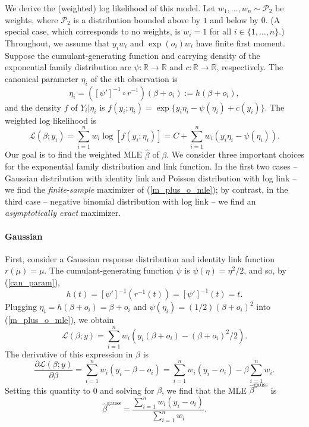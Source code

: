 \documentclass[12pt]{article}
\begin{document}
\begin{appendices}
\begin{refsection}
		We derive the (weighted) log likelihood of this model. Let $w_1, \dots, w_n \sim \mathcal{P}_2$ be weights, where $\mathcal{P}_2$ is a distribution bounded above by $1$ and below by $0$. (A special case, which corresponds to no weights, is $w_i = 1$ for all $i \in \{1, \dots, n\}$.) Throughout, we assume that $y_iw_i$ and $\exp(o_i)w_i$ have finite first moment.  Suppose the cumulant-generating function and carrying density of the exponential family distribution are $\psi:\mathbb{R} \to \mathbb{R}$ and $c: \mathbb{R} \to \mathbb{R}$, respectively. The canonical parameter $\eta_i$ of the $i$th observation is 
		\begin{equation}\label{can_param}
		\eta_i = ([\psi']^{-1} \circ r^{-1})(\beta + o_i) := h(\beta + o_i),
		\end{equation}
		and the density $f$ of $Y_i | \eta_i$ is
		$f(y_i; \eta_i) = \exp\{y_i \eta_i - \psi(\eta_i) + c(y_i)\}.$ The weighted log likelihood is
		\begin{equation}\label{m_plus_o_mle}
		\mathcal{L}(\beta;y_i) = \sum_{i=1}^n w_i\log\left[f(y_i;\eta_i)\right] = C + \sum_{i=1}^n w_i(y_i \eta _i - \psi(\eta_i)).
		\end{equation}
		Our goal is to find the weighted MLE $\hat{\beta}$ of $\beta$. We consider three important choices for the exponential family distribution and link function. %
		In the first two cases -- Gaussian distribution with identity link and Poisson distribution with log link -- we find the \textit{finite-sample} maximizer of (\ref{m_plus_o_mle}); by contrast, in the third case -- negative binomial distribution with log link -- we find an \textit{asymptotically exact} maximizer.
		
		\paragraph{Gaussian}
		First, consider a Gaussian response distribution and identity link function $r(\mu) = \mu$. The cumulant-generating function $\psi$ is $\psi(\eta) = \eta^2/2$, and so, by (\ref{can_param}),
		$$h(t) = [\psi']^{-1}( r^{-1}(t)) = [\psi']^{-1}(t) = t.$$
		Plugging $\eta_i = h(\beta + o_i) = \beta + o_i$ and $\psi(\eta_i) = (1/2)(\beta + o_i)^2$ into (\ref{m_plus_o_mle}), we obtain
		$$\mathcal{L}(\beta; y) = \sum_{i=1}^n w_i (y_i(\beta + o_i) - (\beta + o_i)^2/2).$$ The derivative of this expression in $\beta$ is
		$$\frac{\partial \mathcal{L}(\beta;y)}{\partial\beta} = \sum_{i=1}^n w_i (y_i - \beta - o_i) = \sum_{i=1}^n w_i(y_i - o_i) - \beta \sum_{i=1}^n w_i.$$ Setting this quantity to 0 and solving for $\beta$, we find that the MLE $\hat{\beta}^\textrm{gauss}$ is
		$$\hat{\beta}^\textrm{gauss} = \frac{\sum_{i=1}^n w_i (y_i - o_i)}{\sum_{i=1}^n w_i}.$$
		

\end{refsection}
\end{appendices}
\end{document}
